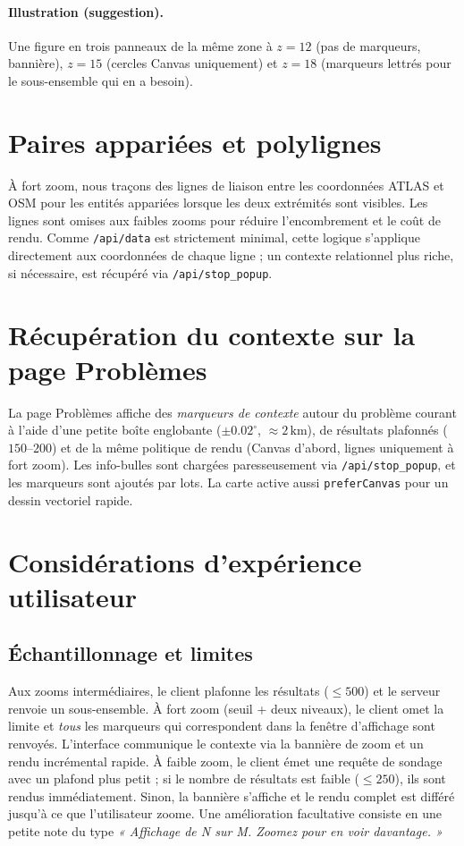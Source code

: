 \paragraph{Illustration (suggestion).} Une figure en trois panneaux de la même zone à \(z=12\) (pas de marqueurs, bannière), \(z=15\) (cercles Canvas uniquement) et \(z=18\) (marqueurs lettrés pour le sous-ensemble qui en a besoin).

\section{Paires appariées et polylignes}
À fort zoom, nous traçons des lignes de liaison entre les coordonnées ATLAS et OSM pour les entités appariées lorsque les deux extrémités sont visibles. Les lignes sont omises aux faibles zooms pour réduire l’encombrement et le coût de rendu. Comme \texttt{/api/data} est strictement minimal, cette logique s’applique directement aux coordonnées de chaque ligne ; un contexte relationnel plus riche, si nécessaire, est récupéré via \texttt{/api/stop\_popup}.

\section{Récupération du contexte sur la page Problèmes}
\label{sec:problems-context}
La page Problèmes affiche des \emph{marqueurs de contexte} autour du problème courant à l’aide d’une petite boîte englobante (\(\pm 0.02^\circ\), \(\approx 2\,\mathrm{km}\)), de résultats plafonnés (\(150\)–\(200\)) et de la même politique de rendu (Canvas d’abord, lignes uniquement à fort zoom). Les info-bulles sont chargées paresseusement via \texttt{/api/stop\_popup}, et les marqueurs sont ajoutés par lots. La carte active aussi \verb|preferCanvas| pour un dessin vectoriel rapide.

\section{Considérations d’expérience utilisateur}
\subsection{Échantillonnage et limites}
Aux zooms intermédiaires, le client plafonne les résultats (\(\leq500\)) et le serveur renvoie un sous-ensemble. À fort zoom (seuil + deux niveaux), le client omet la limite et \emph{tous} les marqueurs qui correspondent dans la fenêtre d’affichage sont renvoyés. L’interface communique le contexte via la bannière de zoom et un rendu incrémental rapide. À faible zoom, le client émet une requête de sondage avec un plafond plus petit ; si le nombre de résultats est faible (\(\leq250\)), ils sont rendus immédiatement. Sinon, la bannière s’affiche et le rendu complet est différé jusqu’à ce que l’utilisateur zoome. Une amélioration facultative consiste en une petite note du type \emph{« Affichage de N sur M. Zoomez pour en voir davantage. »}

